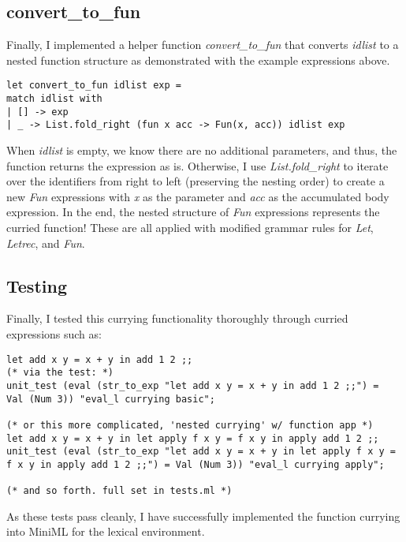\documentclass[12pt]{article}
\begin{document}
\subsection*{convert\_to\_fun}
Finally, I implemented a helper function \textit{convert\_to\_fun} that converts \textit{idlist} to a nested function structure as demonstrated with the example expressions above. 

\begin{verbatim}
let convert_to_fun idlist exp = 
match idlist with
| [] -> exp
| _ -> List.fold_right (fun x acc -> Fun(x, acc)) idlist exp
\end{verbatim}

When \textit{idlist} is empty, we know there are no additional parameters, and thus, the function returns the expression as is. Otherwise, I use \textit{List.fold\_right} to iterate over the identifiers from right to left (preserving the nesting order) to create a new \textit{Fun} expressions with \textit{x} as the parameter and \textit{acc} as the accumulated body expression. In the end, the nested structure of \textit{Fun} expressions represents the curried function!
These are all applied with modified grammar rules for \textit{Let}, \textit{Letrec}, and \textit{Fun}.

\subsection*{Testing}
Finally, I tested this currying functionality thoroughly through curried expressions such as:
\begin{verbatim}
let add x y = x + y in add 1 2 ;;
(* via the test: *)
unit_test (eval (str_to_exp "let add x y = x + y in add 1 2 ;;") = 
Val (Num 3)) "eval_l currying basic";

(* or this more complicated, 'nested currying' w/ function app *)
let add x y = x + y in let apply f x y = f x y in apply add 1 2 ;;
unit_test (eval (str_to_exp "let add x y = x + y in let apply f x y = 
f x y in apply add 1 2 ;;") = Val (Num 3)) "eval_l currying apply";

(* and so forth. full set in tests.ml *)
\end{verbatim}
As these tests pass cleanly, I have successfully implemented the function currying into MiniML for the lexical environment.
\end{document}
